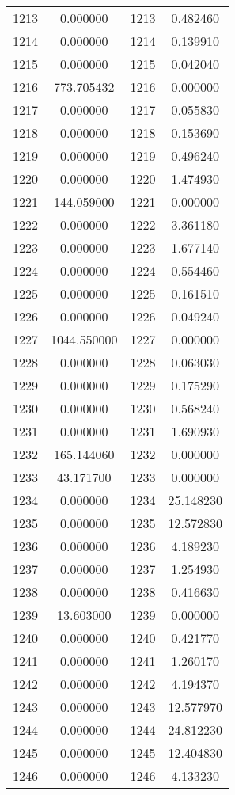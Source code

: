 \documentclass[12pt]{article}
\begin{document}
\begin{longtable}{@{}cccc@{}}
1213 & 0.000000 & 1213 & 0.482460 \\
1214 & 0.000000 & 1214 & 0.139910 \\
1215 & 0.000000 & 1215 & 0.042040 \\
1216 & 773.705432 & 1216 & 0.000000 \\
1217 & 0.000000 & 1217 & 0.055830 \\
1218 & 0.000000 & 1218 & 0.153690 \\
1219 & 0.000000 & 1219 & 0.496240 \\
1220 & 0.000000 & 1220 & 1.474930 \\
1221 & 144.059000 & 1221 & 0.000000 \\
1222 & 0.000000 & 1222 & 3.361180 \\
1223 & 0.000000 & 1223 & 1.677140 \\
1224 & 0.000000 & 1224 & 0.554460 \\
1225 & 0.000000 & 1225 & 0.161510 \\
1226 & 0.000000 & 1226 & 0.049240 \\
1227 & 1044.550000 & 1227 & 0.000000 \\
1228 & 0.000000 & 1228 & 0.063030 \\
1229 & 0.000000 & 1229 & 0.175290 \\
1230 & 0.000000 & 1230 & 0.568240 \\
1231 & 0.000000 & 1231 & 1.690930 \\
1232 & 165.144060 & 1232 & 0.000000 \\
1233 & 43.171700 & 1233 & 0.000000 \\
1234 & 0.000000 & 1234 & 25.148230 \\
1235 & 0.000000 & 1235 & 12.572830 \\
1236 & 0.000000 & 1236 & 4.189230 \\
1237 & 0.000000 & 1237 & 1.254930 \\
1238 & 0.000000 & 1238 & 0.416630 \\
1239 & 13.603000 & 1239 & 0.000000 \\
1240 & 0.000000 & 1240 & 0.421770 \\
1241 & 0.000000 & 1241 & 1.260170 \\
1242 & 0.000000 & 1242 & 4.194370 \\
1243 & 0.000000 & 1243 & 12.577970 \\
1244 & 0.000000 & 1244 & 24.812230 \\
1245 & 0.000000 & 1245 & 12.404830 \\
1246 & 0.000000 & 1246 & 4.133230 \\

\end{longtable}
\end{document}
